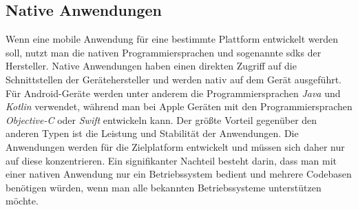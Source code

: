 \subsection{Native Anwendungen}
Wenn eine mobile Anwendung für eine bestimmte Plattform entwickelt werden soll, nutzt man die nativen Programmiersprachen und sogenannte \Glspl{sdk} der Hersteller.
Native Anwendungen haben einen direkten Zugriff auf die Schnittstellen der Gerätehersteller und werden nativ auf dem Gerät ausgeführt.
Für Android-Geräte werden unter anderem die Programmiersprachen \textit{Java} und \textit{Kotlin} verwendet, während man bei Apple Geräten mit den Programmiersprachen \textit{Objective-C} oder \textit{Swift} entwickeln kann.
Der größte Vorteil gegenüber den anderen Typen ist die Leistung und Stabilität der Anwendungen.
Die Anwendungen werden für die Zielplatform entwickelt und müssen sich daher nur auf diese konzentrieren.
Ein signifikanter Nachteil besteht darin, dass man mit einer nativen Anwendung nur ein Betriebssystem bedient und mehrere Codebasen benötigen würden, wenn man alle bekannten Betriebssysteme unterstützen möchte.

